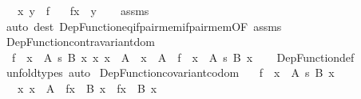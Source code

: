\begin{isabellebody}
\ \ \ {\isachardoublequoteopen}{\isasymlangle}x{\isacharcomma}{\kern0pt}\ y{\isasymrangle}\ {\isasymin}\ f{\isachardoublequoteclose}\isanewline
\ \ \ {\isachardoublequoteopen}f{\isacharbackquote}{\kern0pt}x\ {\isacharequal}{\kern0pt}\ y{\isachardoublequoteclose}\isanewline
%
\isadelimproof
\ \ %
\endisadelimproof
%
\isatagproof
{}\isamarkupfalse%
\ assms\ \isamarkupfalse%
\ {\isacharparenleft}{\kern0pt}auto\ dest{\isacharcolon}{\kern0pt}\ Dep{\isacharunderscore}{\kern0pt}Function{\isacharunderscore}{\kern0pt}eq{\isacharunderscore}{\kern0pt}if{\isacharunderscore}{\kern0pt}pair{\isacharunderscore}{\kern0pt}mem{\isacharunderscore}{\kern0pt}if{\isacharunderscore}{\kern0pt}pair{\isacharunderscore}{\kern0pt}mem{\isacharbrackleft}{\kern0pt}OF\ assms{\isacharbrackright}{\kern0pt}{\isacharparenright}{\kern0pt}%
\endisatagproof
{\isafoldproof}%
%
\isadelimproof
\isanewline
%
\endisadelimproof
\isanewline
{}\isamarkupfalse%
\ Dep{\isacharunderscore}{\kern0pt}Function{\isacharunderscore}{\kern0pt}contravariant{\isacharunderscore}{\kern0pt}dom{\isacharcolon}{\kern0pt}\isanewline
\ \ {\isachardoublequoteopen}{\isasymlbrakk}f\ {\isacharcolon}{\kern0pt}\ {\isacharparenleft}{\kern0pt}x\ {\isacharcolon}{\kern0pt}\ A{\isacharparenright}{\kern0pt}\ {\isasymrightarrow}s\ B\ x{\isacharsemicolon}{\kern0pt}\ {\isasymAnd}x{\isachardot}{\kern0pt}\ x\ {\isacharcolon}{\kern0pt}\ A{\isacharprime}{\kern0pt}\ {\isasymLongrightarrow}\ x\ {\isacharcolon}{\kern0pt}\ A{\isasymrbrakk}\ {\isasymLongrightarrow}\ f\ {\isacharcolon}{\kern0pt}\ {\isacharparenleft}{\kern0pt}x\ {\isacharcolon}{\kern0pt}\ A{\isacharprime}{\kern0pt}{\isacharparenright}{\kern0pt}\ {\isasymrightarrow}s\ B\ x{\isachardoublequoteclose}\isanewline
%
\isadelimproof
\ \ %
\endisadelimproof
%
\isatagproof
{}\isamarkupfalse%
\ Dep{\isacharunderscore}{\kern0pt}Function{\isacharunderscore}{\kern0pt}def\ \isamarkupfalse%
\ unfold{\isacharunderscore}{\kern0pt}types\ auto%
\endisatagproof
{\isafoldproof}%
%
\isadelimproof
\isanewline
%
\endisadelimproof
\isanewline
{}\isamarkupfalse%
\ Dep{\isacharunderscore}{\kern0pt}Function{\isacharunderscore}{\kern0pt}covariant{\isacharunderscore}{\kern0pt}codom{\isacharcolon}{\kern0pt}\isanewline
\ \ \ {\isachardoublequoteopen}f\ {\isacharcolon}{\kern0pt}\ {\isacharparenleft}{\kern0pt}x\ {\isacharcolon}{\kern0pt}\ A{\isacharparenright}{\kern0pt}\ {\isasymrightarrow}s\ B\ x{\isachardoublequoteclose}\isanewline
\ \ \ {\isachardoublequoteopen}{\isasymAnd}x{\isachardot}{\kern0pt}\ x\ {\isacharcolon}{\kern0pt}\ A\ {\isasymLongrightarrow}\ f{\isacharbackquote}{\kern0pt}x\ {\isacharcolon}{\kern0pt}\ B\ x\ {\isasymLongrightarrow}\ f{\isacharbackquote}{\kern0pt}x\ {\isacharcolon}{\kern0pt}\ B{\isacharprime}{\kern0pt}\ x{\isachardoublequoteclose}\isanewline

\end{isabellebody}
